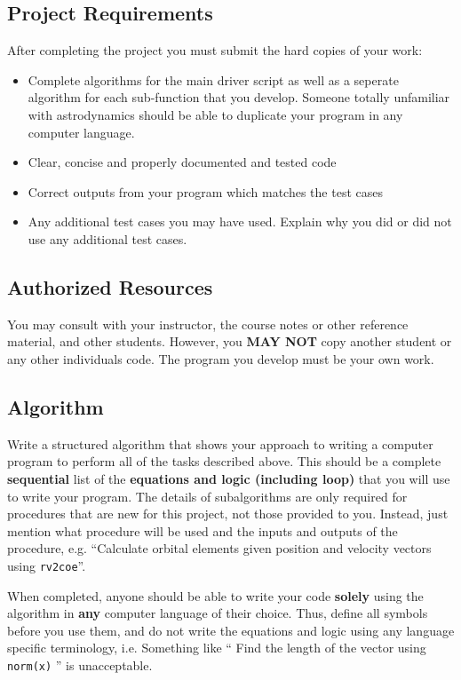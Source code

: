 \documentclass[11pt, reqno]{article}    %
\begin{document}
\subsection*{Project Requirements}
After completing the project you must submit the hard copies of your work:
\begin{itemize}
    \item Complete algorithms for the main driver script as well as a seperate algorithm for each sub-function that you develop.
        Someone totally unfamiliar with astrodynamics should be able to duplicate your program in any computer language.
    \item Clear, concise and properly documented and tested code
    \item Correct outputs from your program which matches the test cases
    \item Any additional test cases you may have used. 
        Explain why you did or did not use any additional test cases.
\end{itemize}

\subsection*{Authorized Resources}
You may consult with your instructor, the course notes or other reference material, and other students. 
However, you \textbf{MAY NOT} copy another student or any other individuals code. 
The program you develop must be your own work.

\subsection*{Algorithm}

Write a structured algorithm that shows your approach to writing a computer program to perform all of the tasks described above.
This should be a complete \textbf{sequential} list of the \textbf{equations and logic (including loop)} that you will use to write your program.
The details of subalgorithms are only required for procedures that are new for this project, not those provided to you.
Instead, just mention what procedure will be used and the inputs and outputs of the procedure, e.g. ``Calculate orbital elements given position and velocity vectors using \texttt{rv2coe}''.

When completed, anyone should be able to write your code \textbf{solely} using the algorithm in \textbf{any} computer language of their choice.
Thus, define all symbols before you use them, and do not write the equations and logic using any language specific terminology, i.e. Something like `` Find the length of the vector using \texttt{norm(x)} '' is unacceptable.
\end{document}
